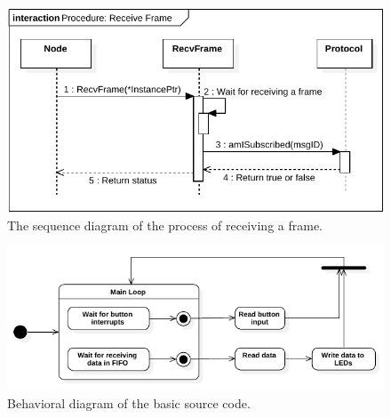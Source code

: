 \begin{figure}[h!]
	\centering
	\includegraphics[width = 1.1\linewidth]{graphics/SeqDiagram_RecvFrame.pdf}
	\caption{The sequence diagram of the process of receiving a frame.}
	\label{fig:SeqDiagram_RecvFrame}
\end{figure}



\begin{figure}[h!]
	\centering
	\includegraphics[width = 1.1\linewidth]{graphics/StateDiagram_CanStackTestCode.pdf}
	\caption{Behavioral diagram of the basic source code.}
	\label{fig:CAN_Testing_StateDiagr_Code}
\end{figure}
